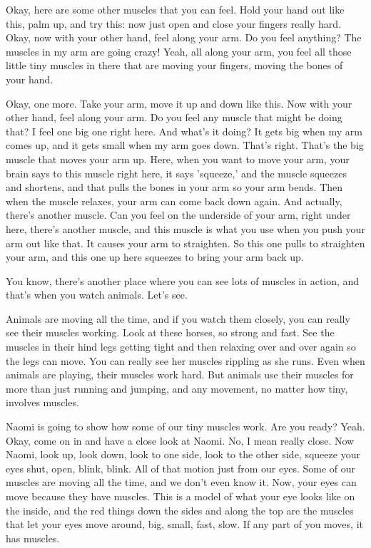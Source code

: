 Okay, here are some other muscles that you can feel. Hold your hand out like this, palm up, and try this: now just open and close your fingers really hard. Okay, now with your other hand, feel along your arm. Do you feel anything?
The muscles in my arm are going crazy!
Yeah, all along your arm, you feel all those little tiny muscles in there that are moving your fingers, moving the bones of your hand.

Okay, one more. Take your arm, move it up and down like this. Now with your other hand, feel along your arm. Do you feel any muscle that might be doing that?
I feel one big one right here.
And what's it doing?
It gets big when my arm comes up, and it gets small when my arm goes down.
That's right. That's the big muscle that moves your arm up. Here, when you want to move your arm, your brain says to this muscle right here, it says 'squeeze,' and the muscle squeezes and shortens, and that pulls the bones in your arm so your arm bends. Then when the muscle relaxes, your arm can come back down again. And actually, there's another muscle. Can you feel on the underside of your arm, right under here, there's another muscle, and this muscle is what you use when you push your arm out like that. It causes your arm to straighten. So this one pulls to straighten your arm, and this one up here squeezes to bring your arm back up.

You know, there's another place where you can see lots of muscles in action, and that's when you watch animals. Let's see.

Animals are moving all the time, and if you watch them closely, you can really see their muscles working. Look at these horses, so strong and fast. See the muscles in their hind legs getting tight and then relaxing over and over again so the legs can move. You can really see her muscles rippling as she runs. Even when animals are playing, their muscles work hard. But animals use their muscles for more than just running and jumping, and any movement, no matter how tiny, involves muscles.

Naomi is going to show how some of our tiny muscles work. Are you ready? Yeah. Okay, come on in and have a close look at Naomi. No, I mean really close. Now Naomi, look up, look down, look to one side, look to the other side, squeeze your eyes shut, open, blink, blink. All of that motion just from our eyes. Some of our muscles are moving all the time, and we don't even know it. Now, your eyes can move because they have muscles. This is a model of what your eye looks like on the inside, and the red things down the sides and along the top are the muscles that let your eyes move around, big, small, fast, slow. If any part of you moves, it has muscles.

